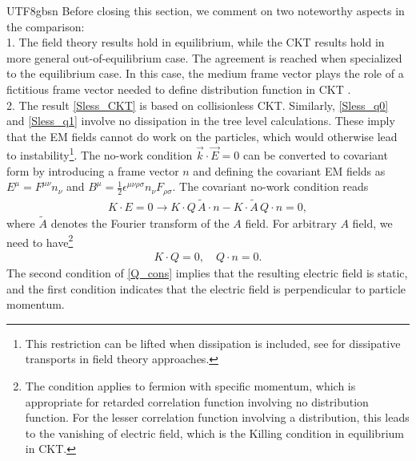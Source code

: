 \documentclass[11pt]{article}\def\baselinestretch{1.4}
\def\e{{\epsilon}}
\def\m{{\mu}}
\def\n{{\nu}}
\def\r{{\rho}}
\def\s{{\sigma}}
\begin{document}
\begin{CJK}{UTF8}{gbsn}
Before  closing this section, we comment on two noteworthy aspects in the comparison:\\
1. The field theory results hold in equilibrium, while the CKT results hold in more general out-of-equilibrium case. The agreement is reached when specialized to the equilibrium case. In this case, the medium frame vector plays the role of a fictitious frame vector needed to define distribution function in CKT \cite{Chen:2014cla}.\\
2. The result \eqref{Sless_CKT} is based on collisionless CKT. Similarly, \eqref{Sless_q0} and \eqref{Sless_q1} involve no dissipation in the tree level calculations. These imply that the EM fields cannot do work on the particles, which would otherwise lead to instability\footnote{This restriction can be lifted when dissipation is included, see \cite{Gagnon:2006hi,Gagnon:2007qt} for dissipative transports in field theory approaches.}. The no-work condition $\vec{k}\cdot\vec{E}=0$ can be converted to covariant form by introducing a frame vector $n$ and defining the covariant EM fields as $E^\m=F^{\m\n}n_\n$ and $B^\m=\frac{1}{2}\e^{\m\n\r\s}n_\n F_{\r\s}$. The covariant no-work condition reads
\begin{align}
K\cdot E=0\to K\cdot Q\, \tilde{A}\cdot n-K\cdot \tilde{A}\, Q\cdot n=0,
\end{align}
where $\tilde{A}$ denotes the Fourier transform of the $A$ field. For arbitrary $A$ field, we need to have\footnote{The condition applies to fermion with specific momentum, which is appropriate for retarded correlation function involving no distribution function. For the lesser correlation function involving a distribution, this leads to the vanishing of electric field, which is the Killing condition in equilibrium in CKT.}
\begin{align}\label{Q_cons}
K\cdot Q=0,\quad Q\cdot n=0.
\end{align}
The second condition of \eqref{Q_cons} implies that the resulting electric field is static, and the first condition indicates that the electric field is perpendicular to particle momentum.



\end{CJK}
\end{document}
